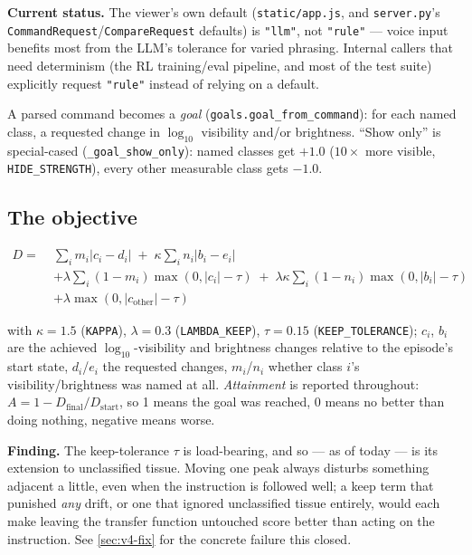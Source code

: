 \documentclass[10pt]{article}
\newcommand{\finding}[1]{\begin{findingbox}\textbf{Finding.} #1\end{findingbox}}
\newcommand{\status}[1]{\begin{findingbox}[colframe=black!30]\textbf{Current status.} #1\end{findingbox}}
\newcommand{\code}[1]{\texttt{#1}}
\begin{document}
\status{The viewer's own default (\code{static/app.js}, and \code{server.py}'s
\code{CommandRequest}/\code{CompareRequest} defaults) is \code{"llm"}, not
\code{"rule"} --- voice input benefits most from the LLM's tolerance for
varied phrasing. Internal callers that need determinism (the RL
training/eval pipeline, and most of the test suite) explicitly request
\code{"rule"} instead of relying on a default.}

A parsed command becomes a \emph{goal} (\code{goals.goal\_from\_command}):
for each named class, a requested change in $\log_{10}$ visibility and/or
brightness. ``Show only'' is special-cased (\code{\_goal\_show\_only}): named
classes get $+1.0$ ($10\times$ more visible, \code{HIDE\_STRENGTH}), every
other measurable class gets $-1.0$.

\subsection{The objective}
\label{sec:objective}

\begin{equation*}
\begin{aligned}
D = \; & \sum_i m_i |c_i - d_i| \;+\; \kappa \sum_i n_i |b_i - e_i| \\
       & + \lambda \sum_i (1-m_i) \max(0, |c_i| - \tau) \;+\; \lambda \kappa \sum_i (1-n_i) \max(0, |b_i| - \tau) \\
       & + \lambda \max(0, |c_{\text{other}}| - \tau)
\end{aligned}
\end{equation*}

with $\kappa = 1.5$ (\code{KAPPA}), $\lambda = 0.3$ (\code{LAMBDA\_KEEP}),
$\tau = 0.15$ (\code{KEEP\_TOLERANCE}); $c_i$, $b_i$ are the achieved
$\log_{10}$-visibility and brightness changes relative to the episode's
start state, $d_i$/$e_i$ the requested changes, $m_i$/$n_i$ whether class
$i$'s visibility/brightness was named at all. \emph{Attainment} is reported
throughout: $A = 1 - D_{\text{final}}/D_{\text{start}}$, so 1 means the goal
was reached, 0 means no better than doing nothing, negative means worse.

\finding{The keep-tolerance $\tau$ is load-bearing, and so --- as of today
--- is its extension to unclassified tissue. Moving one peak always disturbs
something adjacent a little, even when the instruction is followed well; a
keep term that punished \emph{any} drift, or one that ignored unclassified
tissue entirely, would each make leaving the transfer function untouched
score better than acting on the instruction. See \cref{sec:v4-fix} for the
concrete failure this closed.}
\end{document}
